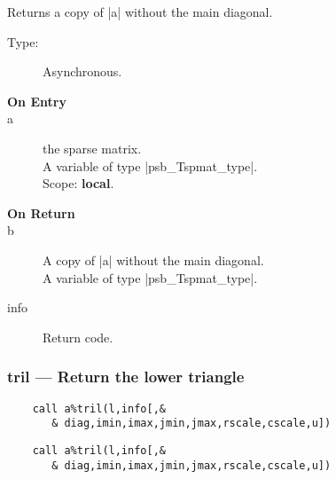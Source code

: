 Returns a copy of \fortinline|a| without the main diagonal.
\begin{description}
\item[Type:] Asynchronous.
\item[\bf On Entry]
\item[a] the sparse matrix.\\
A variable of type \fortinline|psb_Tspmat_type|.\\
Scope: {\bf local}.\\
\end{description}
\begin{description}
\item[\bf On Return]
\item[b] A copy  of  \fortinline|a| without the main diagonal.\\
A variable of type \fortinline|psb_Tspmat_type|.
\item[info] Return code. 
\end{description}


\subsubsection{tril --- Return the lower triangle}

\ifpdf
\begin{verbatim}
    call a%tril(l,info[,&
       & diag,imin,imax,jmin,jmax,rscale,cscale,u])
\end{verbatim}
\else
\begin{verbatim}
    call a%tril(l,info[,&
       & diag,imin,imax,jmin,jmax,rscale,cscale,u])
\end{verbatim}
\fi 

